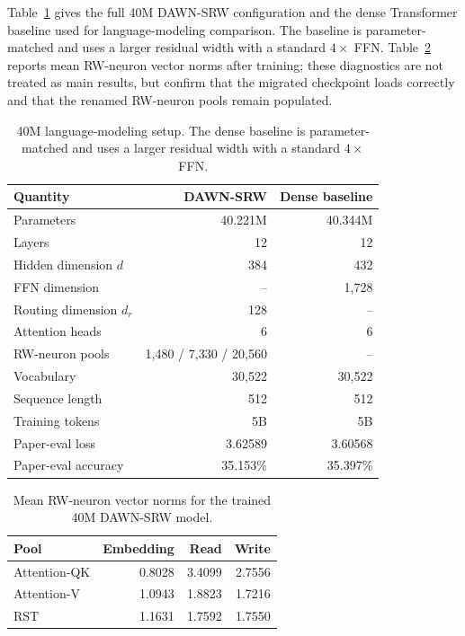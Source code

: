 \documentclass{article}
\begin{document}
Table~\ref{tab:model_config} gives the full 40M DAWN-SRW configuration and the dense Transformer baseline used for language-modeling comparison. The baseline is parameter-matched and uses a larger residual width with a standard $4\times$ FFN. Table~\ref{tab:operator_health} reports mean RW-neuron vector norms after training; these diagnostics are not treated as main results, but confirm that the migrated checkpoint loads correctly and that the renamed RW-neuron pools remain populated.

\begin{table}[t]
\centering
\small
\setlength{\tabcolsep}{4pt}
\begin{tabular}{lrr}
\toprule
Quantity & DAWN-SRW & Dense baseline \\
\midrule
Parameters & 40.221M & 40.344M \\
Layers & 12 & 12 \\
Hidden dimension $d$ & 384 & 432 \\
FFN dimension & -- & 1,728 \\
Routing dimension $d_r$ & 128 & -- \\
Attention heads & 6 & 6 \\
RW-neuron pools & 1,480 / 7,330 / 20,560 & -- \\
Vocabulary & 30,522 & 30,522 \\
Sequence length & 512 & 512 \\
Training tokens & 5B & 5B \\
Paper-eval loss & 3.62589 & 3.60568 \\
Paper-eval accuracy & 35.153\% & 35.397\% \\
\bottomrule
\end{tabular}
\caption{40M language-modeling setup. The dense baseline is parameter-matched and uses a larger residual width with a standard $4\times$ FFN.}
\label{tab:model_config}
\end{table}

\begin{table}[t]
\centering
\small
\begin{tabular}{lrrr}
\toprule
Pool & Embedding & Read & Write \\
\midrule
Attention-QK & 0.8028 & 3.4099 & 2.7556 \\
Attention-V  & 1.0943 & 1.8823 & 1.7216 \\
RST          & 1.1631 & 1.7592 & 1.7550 \\
\bottomrule
\end{tabular}
\caption{Mean RW-neuron vector norms for the trained 40M DAWN-SRW model.}
\label{tab:operator_health}
\end{table}
\end{document}
